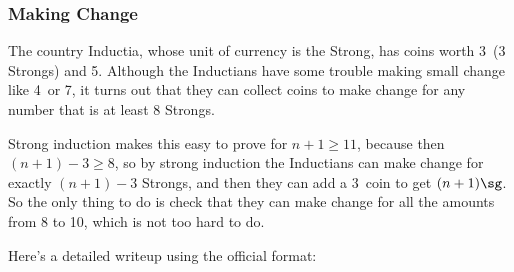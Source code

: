 \subsubsection{Making Change}

The country Inductia, whose unit of currency is the Strong, has coins
worth 3\sg\ (3 Strongs) and 5\sg.  Although the Inductians have some
trouble making small change like 4\sg\ or 7\sg, it turns out that they
can collect coins to make change for any number that is at least 8
Strongs.

Strong induction makes this easy to prove for $n+1 \ge 11$, because then
$(n+1)-3 \ge 8$, so by strong induction the Inductians can make change for
exactly $(n+1)-3$ Strongs, and then they can add a 3\sg\ coin to get
$(n+1)\sg$.  So the only thing to do is check that they can make change
for all the amounts from 8 to 10\sg, which is not too hard to do.

Here's a detailed writeup using the official format:

